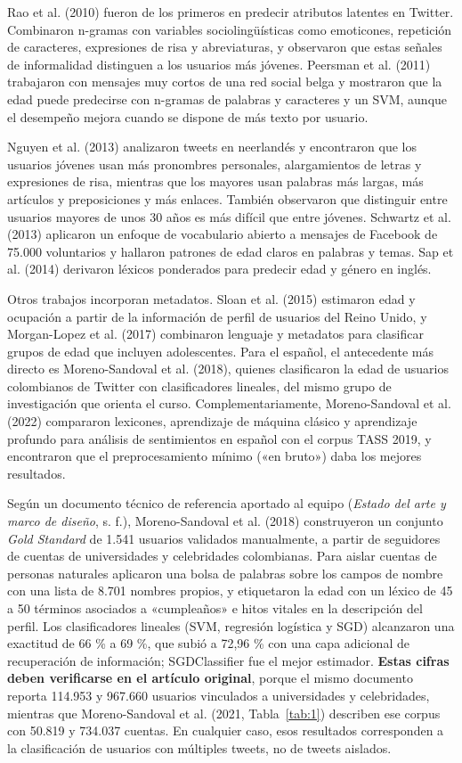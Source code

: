 \documentclass[10pt,twocolumn]{article}
\begin{document}
Rao et al. (2010) fueron de los primeros en predecir atributos latentes en Twitter. Combinaron n-gramas con variables sociolingüísticas como emoticones, repetición de caracteres, expresiones de risa y abreviaturas, y observaron que estas señales de informalidad distinguen a los usuarios más jóvenes. Peersman et al. (2011) trabajaron con mensajes muy cortos de una red social belga y mostraron que la edad puede predecirse con n-gramas de palabras y caracteres y un SVM, aunque el desempeño mejora cuando se dispone de más texto por usuario.

Nguyen et al. (2013) analizaron tweets en neerlandés y encontraron que los usuarios jóvenes usan más pronombres personales, alargamientos de letras y expresiones de risa, mientras que los mayores usan palabras más largas, más artículos y preposiciones y más enlaces. También observaron que distinguir entre usuarios mayores de unos 30 años es más difícil que entre jóvenes. Schwartz et al. (2013) aplicaron un enfoque de vocabulario abierto a mensajes de Facebook de 75.000 voluntarios y hallaron patrones de edad claros en palabras y temas. Sap et al. (2014) derivaron léxicos ponderados para predecir edad y género en inglés.

Otros trabajos incorporan metadatos. Sloan et al. (2015) estimaron edad y ocupación a partir de la información de perfil de usuarios del Reino Unido, y Morgan-Lopez et al. (2017) combinaron lenguaje y metadatos para clasificar grupos de edad que incluyen adolescentes. Para el español, el antecedente más directo es Moreno-Sandoval et al. (2018), quienes clasificaron la edad de usuarios colombianos de Twitter con clasificadores lineales, del mismo grupo de investigación que orienta el curso. Complementariamente, Moreno-Sandoval et al. (2022) compararon lexicones, aprendizaje de máquina clásico y aprendizaje profundo para análisis de sentimientos en español con el corpus TASS 2019, y encontraron que el preprocesamiento mínimo («en bruto») daba los mejores resultados.

Según un documento técnico de referencia aportado al equipo (\textit{Estado del arte y marco de diseño}, s. f.), Moreno-Sandoval et al. (2018) construyeron un conjunto \textit{Gold Standard} de 1.541 usuarios validados manualmente, a partir de seguidores de cuentas de universidades y celebridades colombianas. Para aislar cuentas de personas naturales aplicaron una bolsa de palabras sobre los campos de nombre con una lista de 8.701 nombres propios, y etiquetaron la edad con un léxico de 45 a 50 términos asociados a «cumpleaños» e hitos vitales en la descripción del perfil. Los clasificadores lineales (SVM, regresión logística y SGD) alcanzaron una exactitud de 66 \% a 69 \%, que subió a 72,96 \% con una capa adicional de recuperación de información; SGDClassifier fue el mejor estimador. \textbf{Estas cifras deben verificarse en el artículo original}, porque el mismo documento reporta 114.953 y 967.660 usuarios vinculados a universidades y celebridades, mientras que Moreno-Sandoval et al. (2021, Tabla~\ref{tab:1}) describen ese corpus con 50.819 y 734.037 cuentas. En cualquier caso, esos resultados corresponden a la clasificación de usuarios con múltiples tweets, no de tweets aislados.
\end{document}
